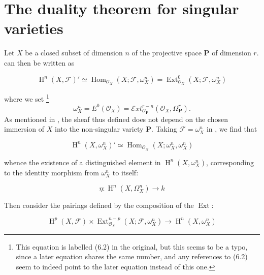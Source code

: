 \section{The duality theorem for singular varieties}\label{fga1-6}


Let $X$ be a closed subset of dimension $n$ of the projective space $\mathbf{P}$ of dimension $r$.
 can then be written as

\begin{equation}\tag{6.1}\label{fga1-equation-6.1}
  \operatorname{H}^n(X,\mathcal{F})'
  \simeq \operatorname{Hom}_{\mathcal{O}_X}(X;\mathcal{F},\omega_X^n)
  = \operatorname{Ext}_{\mathcal{O}_X}^0(X;\mathcal{F},\omega_X^n)
\end{equation}

where we set
\footnote{This equation is labelled (6.2) in the original, but this seems to be a typo, since a later equation shares the same number, and any references to (6.2) seem to indeed point to the later equation instead of this one.}
\[
  \omega_X^n
  = E^0(\mathcal{O}_X)
  = \mathcal{E}xt_{\mathcal{O}_\mathbf{P}}^{r-n}(\mathcal{O}_X,\Omega_\mathbf{P}^r).
\]
As mentioned in , the sheaf thus defined does not depend on the chosen immersion of $X$ into the non-singular variety $\mathbf{P}$.
Taking $\mathcal{F}=\omega_X^n$ in , we find that

\begin{equation}\tag{6.2}\label{fga1-equation-6.2}
  \operatorname{H}^n(X,\omega_X^n)'
  \simeq \operatorname{Hom}_{\mathcal{O}_X}(X;\omega_X^n,\omega_X^n)
\end{equation}

whence the existence of a distinguished element in $\operatorname{H}^n(X,\omega_X^n)$, corresponding to the identity morphism from $\omega_X^n$ to itself:

\begin{equation}\tag{6.3}\label{fga1-equation-6.3}
  \eta\colon \operatorname{H}^n(X,\Omega_X^n) \to k
\end{equation}

Then consider the pairings defined by the composition of the $\operatorname{Ext}$:

\begin{equation}\tag{6.4}\label{fga1-equation-6.4}
  \operatorname{H}^p(X,\mathcal{F}) \times \operatorname{Ext}_{\mathcal{O}_X}^{n-p}(X;\mathcal{F},\omega_X^n)
  \to \operatorname{H}^n(X,\omega_X^n)
\end{equation}

